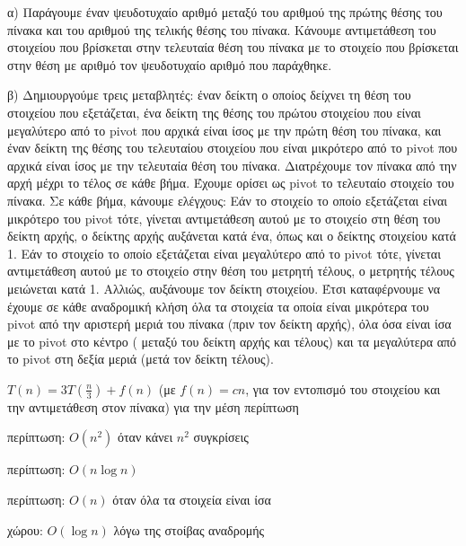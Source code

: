 \documentclass[14pt]{article}
\begin{document}
\begin{center}
    \p α) Παράγουμε έναν ψευδοτυχαίο αριθμό μεταξύ του αριθμού της πρώτης θέσης του πίνακα και του αριθμού της τελικής θέσης του πίνακα. Κάνουμε αντιμετάθεση του στοιχείου που βρίσκεται στην τελευταία θέση του πίνακα με το στοιχείο που βρίσκεται στην θέση με αριθμό τον ψευδοτυχαίο αριθμό που παράχθηκε.\newline
    
    \p β) Δημιουργούμε τρεις μεταβλητές: έναν δείκτη ο οποίος δείχνει τη θέση του στοιχείου που εξετάζεται, ένα δείκτη της θέσης του πρώτου στοιχείου που είναι μεγαλύτερο από το pivot που αρχικά είναι ίσος με την πρώτη θέση του πίνακα, και έναν δείκτη της θέσης του τελευταίου στοιχείου που είναι μικρότερο από το pivot που αρχικά είναι ίσος με την τελευταία θέση του πίνακα. Διατρέχουμε τον πίνακα από την αρχή μέχρι το τέλος σε κάθε βήμα. Έχουμε ορίσει ως pivot το τελευταίο στοιχείο του πίνακα. Σε κάθε βήμα, κάνουμε ελέγχους: Εάν το στοιχείο το οποίο εξετάζεται είναι μικρότερο του pivot τότε, γίνεται αντιμετάθεση αυτού με το στοιχείο στη θέση του δείκτη αρχής, ο δείκτης αρχής αυξάνεται κατά ένα, όπως και ο δείκτης στοιχείου κατά 1. Εάν το στοιχείο το οποίο εξετάζεται είναι μεγαλύτερο από το pivot τότε, γίνεται αντιμετάθεση αυτού με το στοιχείο στην θέση του μετρητή τέλους, ο μετρητής τέλους μειώνεται κατά 1. Αλλιώς, αυξάνουμε τον δείκτη στοιχείου. Έτσι καταφέρνουμε να έχουμε σε κάθε αναδρομική κλήση όλα τα στοιχεία τα οποία είναι μικρότερα του pivot από την αριστερή μεριά του πίνακα (πριν τον δείκτη αρχής), όλα όσα είναι ίσα με το pivot στο κέντρο ( μεταξύ του δείκτη αρχής και τέλους) και τα μεγαλύτερα από το pivot στη δεξία μεριά (μετά τον δείκτη τέλους).\newline
    
    \par$T(n) = 3T(\frac{n}{3}) + f(n)$ (με $f(n) = c n$, για τον εντοπισμό του στοιχείου και την αντιμετάθεση στον πίνακα) για την μέση περίπτωση\newline
    
     περίπτωση: $Ο(n^2)$ όταν κάνει $n^2$ συγκρίσεις\newline
    
     περίπτωση: $O(n\log{}n)$\newline

     περίπτωση: $O(n)$ όταν όλα τα στοιχεία είναι ίσα\newline
    
     χώρου: $O(\log{}n)$ λόγω της στοίβας αναδρομής\newline
    
\end{center}
\end{document}
